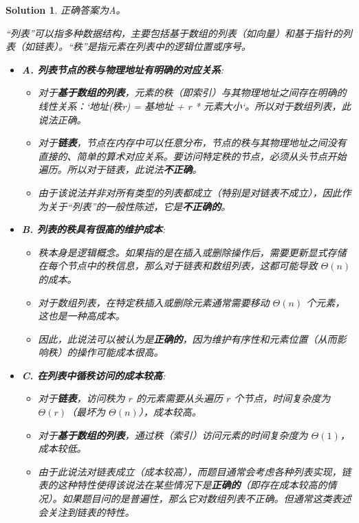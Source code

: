 \documentclass[UTF8]{report}
\newtheorem{solution}{Solution}
\theoremstyle{MyLineTheoremStyle} %
\theoremstyle{MyBlockTheoremStyle} %
\theoremstyle{MySubsubsectionStyle} %
\begin{document}
\begin{solution}
正确答案为A。

“列表”可以指多种数据结构，主要包括基于数组的列表（如向量）和基于指针的列表（如链表）。“秩”是指元素在列表中的逻辑位置或序号。

\begin{itemize}
    \item \textbf{A. 列表节点的秩与物理地址有明确的对应关系}:
    \begin{itemize}
        \item 对于\textbf{基于数组的列表}，元素的秩（即索引）与其物理地址之间存在明确的线性关系：`地址(秩r) = 基地址 + r * 元素大小`。所以对于数组列表，此说法正确。
        \item 对于\textbf{链表}，节点在内存中可以任意分布，节点的秩与其物理地址之间没有直接的、简单的算术对应关系。要访问特定秩的节点，必须从头节点开始遍历。所以对于链表，此说法\textbf{不正确}。
        \item 由于该说法并非对所有类型的列表都成立（特别是对链表不成立），因此作为关于“列表”的一般性陈述，它是\textbf{不正确的}。
    \end{itemize}

    \item \textbf{B. 列表的秩具有很高的维护成本}:
    \begin{itemize}
        \item 秩本身是逻辑概念。如果指的是在插入或删除操作后，需要更新显式存储在每个节点中的秩信息，那么对于链表和数组列表，这都可能导致 $\Theta(n)$ 的成本。
        \item 对于数组列表，在特定秩插入或删除元素通常需要移动 $\Theta(n)$ 个元素，这也是一种高成本。
        \item 因此，此说法可以被认为是\textbf{正确的}，因为维护有序性和元素位置（从而影响秩）的操作可能成本很高。
    \end{itemize}

    \item \textbf{C. 在列表中循秩访问的成本较高}:
    \begin{itemize}
        \item 对于\textbf{链表}，访问秩为 $r$ 的元素需要从头遍历 $r$ 个节点，时间复杂度为 $\Theta(r)$（最坏为 $\Theta(n)$），成本较高。
        \item 对于\textbf{基于数组的列表}，通过秩（索引）访问元素的时间复杂度为 $\Theta(1)$，成本较低。
        \item 由于此说法对链表成立（成本较高），而题目通常会考虑各种列表实现，链表的这种特性使得该说法在某些情况下是\textbf{正确的}（即存在成本较高的情况）。如果题目问的是普遍性，那么它对数组列表不正确。但通常这类表述会关注到链表的特性。
    \end{itemize}


\end{itemize}
\end{solution}
\end{document}

